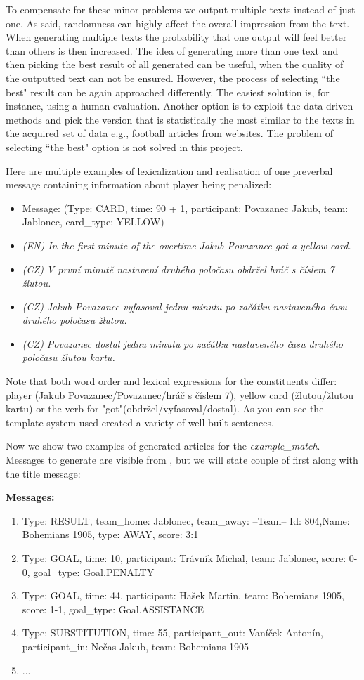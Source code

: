 To compensate for these minor problems we output multiple texts instead of just one. As said, randomness can highly affect the overall impression from the text. When generating multiple texts the probability that one output will feel better than others is then increased. The idea of generating more than one text and then picking the best result of all generated can be useful, when the quality of the outputted text can not be ensured. However, the process of selecting ``the best" result can be again approached differently. The easiest solution is, for instance, using a human evaluation. Another option is to exploit the data-driven methods and pick the version that is statistically the most similar to the texts in the acquired set of data e.g., football articles from websites. The problem of selecting ``the best" option is not solved in this project. 

Here are multiple examples of lexicalization and realisation of one preverbal message containing information about player being penalized:
\begin{itemize}
	\item Message: (Type: CARD, time: 90 + 1, participant: Povazanec Jakub, team: Jablonec, card\_type: YELLOW)
	\item \textit{(EN) In the first minute of the overtime Jakub Povazanec got a yellow card.}
	\item \textit{(CZ) V první minutě nastavení druhého poločasu obdržel hráč s číslem 7 žlutou.}
	\item \textit{(CZ) Jakub Povazanec vyfasoval jednu minutu po začátku nastaveného času druhého poločasu žlutou.}
	\item \textit{(CZ) Povazanec dostal jednu minutu po začátku nastaveného času druhého poločasu žlutou kartu.}
\end{itemize}
Note that both word order and lexical expressions for the constituents differ: player (Jakub Povazanec/Povazanec/hráč s číslem 7), yellow card (žlutou/žlutou kartu) or the verb for "got"(obdržel/vyfasoval/dostal). As you can see the template system used created a variety of well-built sentences.

Now we show two examples of generated articles for the \textit{example\_match}. Messages to generate are visible from , but we will state couple of first along with the title message:

\noindent\makebox[\linewidth]{\rule{\textwidth}{0.4pt}}
\textbf{Messages:}
\begin{enumerate}
	\item Type: RESULT, team\_home: Jablonec, team\_away: --Team-- Id: 804,Name: Bohemians 1905, type: AWAY, score: 3:1
	\item Type: GOAL, time: 10, participant: Trávník Michal, team: Jablonec, score: 0-0, goal\_type: Goal.PENALTY
	\item Type: GOAL, time: 44, participant: Hašek Martin, team: Bohemians 1905, score: 1-1, goal\_type: Goal.ASSISTANCE
	\item Type: SUBSTITUTION, time: 55, participant\_out: Vaníček Antonín, participant\_in: Nečas Jakub, team: Bohemians 1905
	\item ...
\end{enumerate}

